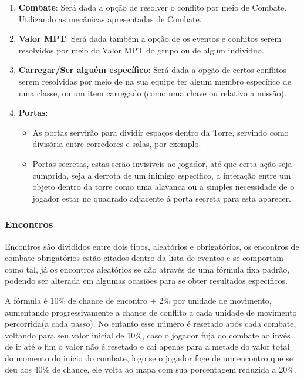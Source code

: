 \documentclass[11pt]{article} %
\begin{document}
\begin{enumerate}
  \item \textbf{Combate}: Será dada a opção de resolver o conflito por meio de Combate. Utilizando as mecânicas apresentadas de Combate.
  \item \textbf{Valor MPT}: Será dada também a opção de os eventos e conflitos serem resolvidos por meio do Valor MPT do grupo ou de algum indivíduo.
  \item \textbf{Carregar/Ser alguém específico}: Será dada a opção de certos conflitos serem resolvidas por meio de na sua equipe ter algum membro específico de uma classe, ou um item carregado (como uma chave ou relativo a missão).
  \item \textbf{Portas}:
  \begin{itemize}
    \item As portas servirão para dividir espaços dentro da Torre, servindo como divisória entre corredores e salas, por exemplo.
    \item Portas secretas, estas serão invisíveis ao jogador, até que certa ação seja cumprida, seja a derrota de um inimigo específico, a interação entre um objeto dentro da torre como uma alavanca ou a simples necessidade de o jogador estar no quadrado adjacente á porta secreta para esta aparecer.
    \end{itemize}
\end{enumerate}

\subsubsection{Encontros}
Encontros são divididos entre dois tipos, aleatórios e obrigatórios, os encontros de combate obrigatórios estão citados dentro da lista de eventos e se comportam como tal, já os encontros aleatórios se dão através de uma fórmula fixa padrão, podendo ser alterada em algumas ocasiões para se obter resultados específicos.

A fórmula é 10\% de chance de encontro + 2\% por unidade de movimento, aumentando progressivamente a chance de conflito a cada unidade de movimento percorrida(a cada passo). No entanto esse número é resetado após cada combate, voltando para seu valor inicial de 10\%, caso o jogador fuja do combate ao invés de ir até o fim o valor não é resetado e cai apenas para a metade do valor total do momento do início do combate, logo se o jogador foge de um encontro que se deu aos 40\% de chance, ele volta ao mapa com sua porcentagem reduzida a 20\%.
\end{document}
